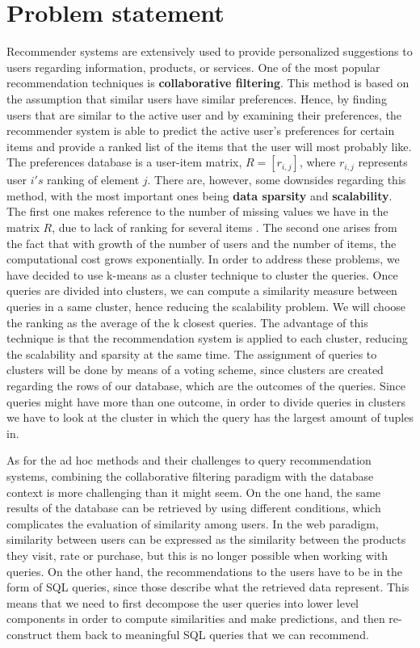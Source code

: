 \documentclass[sigconf]{acmart}
\begin{document}
\section{Problem statement}
Recommender systems are extensively used to provide personalized suggestions to users regarding information, products, or services. One of the most popular recommendation techniques is \textbf{collaborative filtering}. This method is based on the assumption that similar users have similar preferences. Hence, by finding users that are similar to the active user and by examining their preferences, the recommender system is able to predict the active user's preferences for certain items and provide a ranked list of the items that the user will most probably like. The preferences database is a user-item matrix, $R = [r_{i,j}]$, where $r_{i,j}$ represents user $i's$ ranking of element $j$. There are, however, some downsides regarding this method, with the most important ones being \textbf{data sparsity} and \textbf{scalability}. The first one makes reference to the number of missing values we have in the matrix $R$, due to lack of ranking for several items \cite{datasparsity}. The second one arises from the fact that with growth of the number of users and the number of items, the computational cost grows exponentially. In order to address these problems, we have decided to use k-means as a cluster technique to cluster the queries. Once queries are divided into clusters, we can compute a similarity measure between queries in a same cluster, hence reducing the scalability problem. We will choose the ranking as the average of the k closest queries. The advantage of this technique is that the recommendation system is applied to each cluster, reducing the scalability and sparsity at the same time. The assignment of queries to clusters will be done by means of a voting scheme, since clusters are created regarding the rows of our database, which are the outcomes of the queries. Since queries might have more than one outcome, in order to divide queries in clusters we have to look at the cluster in which the query has the largest amount of tuples in. 

As for the ad hoc methods and their challenges to query recommendation systems, combining the collaborative filtering paradigm with the database context is more challenging than it might seem. On the one hand, the same results of the database can be retrieved by using different conditions, which complicates the evaluation of similarity among users. In the web paradigm, similarity between users can be expressed as the similarity between the products they visit, rate or purchase, but this is no longer possible when working with queries. On the other hand, the recommendations to the users have to be in the form of SQL queries, since those describe what the retrieved data represent. This means that we need to first decompose the user queries into lower level components in order to compute similarities and make predictions, and then re-construct them back to meaningful SQL queries that we can recommend.
\end{document}
